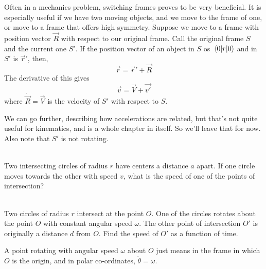     Often in a mechanics problem, switching frames proves to be very beneficial. It is especially useful 
    if we have two moving objects, and we move to the frame of one, or move to a frame that offers high 
    symmetry. Suppose we move to a frame with position vector $\vec{R}$ with respect to our original frame. 
    Call the original frame $S$ and the current one $S'$. If the position vector of an object in $S$ os $\vev{r}$
    and in $S'$ is $\vec{r}'$, then,
    \begin{equation}
        \vec{r} = \vec{r}' + \vec{R}        
    \end{equation}
    The derivative of this gives 
    \begin{equation}
        \vec{v} = \vec{V} + \vec{v'}
    \end{equation}
    where $\dot{\vec{R}} = \vec{V}$ is the velocity of $S'$ with respect to $S$.
    
    We can go further, describing how accelerations are related, but that's not quite useful for kinematics, and 
    is a whole chapter in itself. So we'll leave that for now. Also note that $S'$ is not rotating.

    \begin{exc}
        \begin{exercise}[subtitle={Symmetrical Circles, Kalda}, points = 2]
            \smallskip
            ~\\
            Two intersecting circles of radius $r$ have centers a distance $a$ apart. If one circle moves towards the other with 
            speed $v$, what is the speed of one of the points of intersection?
        \end{exercise}
        \begin{exercise}[subtitle={Rotating Circles, Kalda}, points = 3]
            \smallskip
            ~\\
            Two circles of radius $r$ intersect at the point $O$. One of the circles rotates
            about the point $O$ with constant angular speed $\omega$. The other point of intersection $O'$ is originally a
            distance $d$ from $O$. Find the speed of $O'$ as a function of time.

            A point rotating with angular speed $\omega$ about $O$ just means in the frame in which $O$ is the origin, 
            and in polar co-ordinates, $\dot{\theta} = \omega$. 
        \end{exercise}
    \end{exc}

